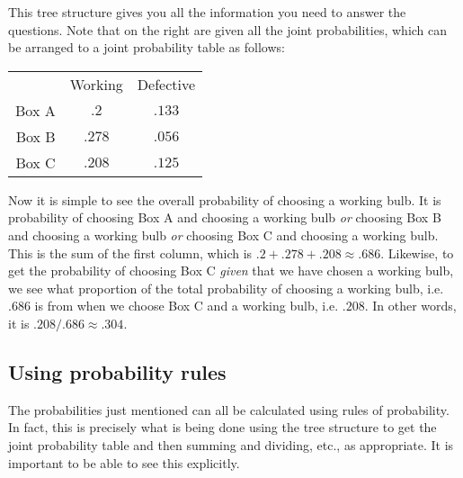\documentclass{mjandrews.notes.palatino}
\begin{document}
This tree structure gives you all the information you need to answer the questions. Note that on the right are given all the joint probabilities, which can be arranged to a joint probability table as follows:
\begin{center}
\begin{tabular}{rcc}
& Working & Defective \\
Box A & $.2$ & $.133$ \\
Box B & $.278$ & $.056$ \\
Box C & $.208$ & $.125$
\end{tabular}
\end{center}
Now it is simple to see the overall probability of choosing a working bulb. It is probability of choosing Box A and choosing a working bulb \emph{or} choosing Box B and choosing a working bulb \emph{or} choosing Box C and choosing a working bulb. This is the sum of the first column, which is $.2+.278+.208\approx.686$. 
Likewise, to get the probability of choosing Box C \emph{given} that we have chosen a working bulb, we see what proportion of the total probability of choosing a working bulb, i.e. $.686$ is from when we choose Box C and a working bulb, i.e. $.208$. In other words, it is $.208/.686\approx .304$. 

\subsection{Using probability rules}

The probabilities just mentioned can all be calculated using rules of
probability. In fact, this is precisely what is being done using the tree
structure to get the joint probability table and then summing and dividing,
etc., as appropriate. It is important to be able to see this explicitly.  
\end{document}
